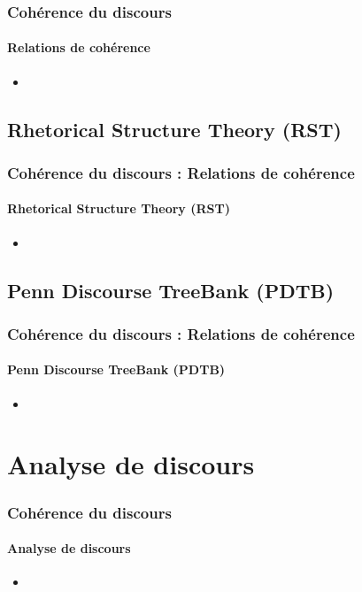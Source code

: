\documentclass[xcolor=table]{beamer}
\begin{document}
\begin{frame}
	\frametitle{Cohérence du discours}
	\framesubtitle{Relations de cohérence}
	
	\begin{itemize}
		\item 
	\end{itemize}
	
\end{frame}

\subsection{Rhetorical Structure Theory (RST)}

\begin{frame}
\frametitle{Cohérence du discours : Relations de cohérence}
\framesubtitle{Rhetorical Structure Theory (RST)}
	
	\begin{itemize}
		\item 
	\end{itemize}
	
\end{frame}

\subsection{Penn Discourse TreeBank (PDTB)}

\begin{frame}
	\frametitle{Cohérence du discours : Relations de cohérence}
	\framesubtitle{Penn Discourse TreeBank (PDTB)}
	
	\begin{itemize}
		\item 
	\end{itemize}
	
\end{frame}

\section{Analyse de discours}

\begin{frame}
	\frametitle{Cohérence du discours}
	\framesubtitle{Analyse de discours}
	
	\begin{itemize}
		\item 
	\end{itemize}
	
\end{frame}
\end{document}
